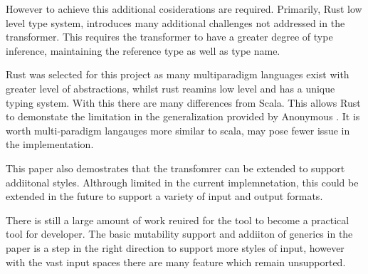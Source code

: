 \documentclass[ oneside,%
                    author={James Elgar},
                    degree={MEng},
                     title={Bidirectional transformer between functional and \\ object-oriented programming in Rust},
                  subtitle={}]{dissertation}
\newcommand{\weixin}{Anonymous }
\begin{document}
However to achieve this additional cosiderations are required. Primarily, Rust low level type system, introduces many additional challenges not addressed in the \cite{food} transformer. This requires the transformer to have a greater degree of type inference, maintaining the reference type as well as type name.

Rust was selected for this project as many multiparadigm languages exist with greater level of abstractions, whilst rust reamins low level and has a unique typing system. With this there are many differences from Scala. This allows Rust to demonstate the limitation in the generalization provided by 
\weixin. It is worth multi-paradigm langauges more similar to scala, may pose fewer issue in the implementation.

This paper also demostrates that the transfomrer can be extended to support addiitonal styles. Althrough limited in the current implemnetation, this could be extended in the future to support a variety of input and output formats.

There is still a large amount of work reuired for the tool to become a practical tool for developer. The basic mutability support and addiiton of generics in the paper is a step in the right direction to support more styles of input, however with the vast input spaces there are many feature which remain unsupported.


\end{document}
